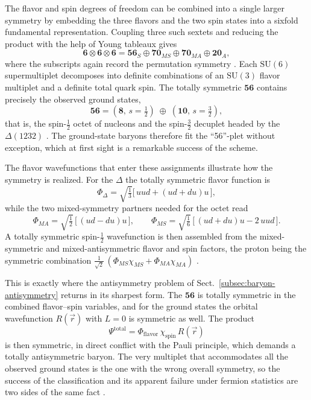 The flavor and spin degrees of freedom can be combined into a single larger symmetry
by embedding the three flavors and the two spin states into a sixfold fundamental
representation. Coupling three such sextets and reducing the product with the help of
Young tableaux gives
\begin{equation}
    \mathbf{6} \otimes \mathbf{6} \otimes \mathbf{6}
    = \mathbf{56}_{S} \oplus \mathbf{70}_{MS} \oplus \mathbf{70}_{MA}
      \oplus \mathbf{20}_{A},
    \label{eq:su6-6x6x6}
\end{equation}
where the subscripts again record the permutation symmetry \cite[Ch.~13]{Amsler2018}.
Each $\mathrm{SU}(6)$ supermultiplet decomposes into definite combinations of an
$\mathrm{SU}(3)$ flavor multiplet and a definite total quark spin. The totally
symmetric $\mathbf{56}$ contains precisely the observed ground states,
\begin{equation}
    \mathbf{56} = (\mathbf{8},\, s=\tfrac{1}{2}) \;\oplus\; (\mathbf{10},\, s=\tfrac{3}{2}),
\end{equation}
that is, the spin-$\tfrac{1}{2}$ octet of nucleons and the spin-$\tfrac{3}{2}$
decuplet headed by the $\Delta(1232)$ \cite[Ch.~13]{Amsler2018}. The ground-state
baryons therefore fit the ``56''-plet without exception, which at first sight is a
remarkable success of the scheme.

The flavor wavefunctions that enter these assignments illustrate how the symmetry is
realized. For the $\Delta$ the totally symmetric flavor function is
\begin{equation}
    \Phi_{\Delta} = \sqrt{\tfrac{1}{3}}
    \big[\, uud + (ud + du)u \,\big],
\end{equation}
while the two mixed-symmetry partners needed for the octet read
\begin{equation}
    \Phi_{MA} = \sqrt{\tfrac{1}{2}}\,\big[\,(ud - du)u\,\big],
    \qquad
    \Phi_{MS} = \sqrt{\tfrac{1}{6}}\,\big[\,(ud + du)u - 2\,uud\,\big].
\end{equation}
A totally symmetric spin-$\tfrac{1}{2}$ wavefunction is then assembled from the
mixed-symmetric and mixed-antisymmetric flavor and spin factors, the proton being the
symmetric combination $\tfrac{1}{\sqrt{2}}\,(\Phi_{MS}\chi_{MS}
+ \Phi_{MA}\chi_{MA})$ \cite[Ch.~13]{Amsler2018}.

This is exactly where the antisymmetry problem of Sect.~\ref{subsec:baryon-antisymmetry}
returns in its sharpest form. The $\mathbf{56}$ is totally symmetric in the combined
flavor--spin variables, and for the ground states the orbital wavefunction $R(\vec r)$
with $L=0$ is symmetric as well. The product
\begin{equation}
    \Psi^{\text{total}} = \Phi_{\text{flavor}}\,\chi_{\text{spin}}\,R(\vec{r})
\end{equation}
is then symmetric, in direct conflict with the Pauli principle, which demands a
totally antisymmetric baryon. The very multiplet that accommodates all the observed
ground states is the one with the wrong overall symmetry, so the success of the
classification and its apparent failure under fermion statistics are two sides of the
same fact \cite[Ch.~13]{Amsler2018}.


